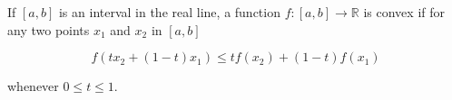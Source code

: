 If $[a, b]$ is an interval in the real line, a function $f: [a, b] \to \mathbb{R}$ is convex if for any two points $x_1$ and $x_2$ in $[a, b]$

$$f(tx_2 + (1-t)x_1) \leq tf(x_2) + (1-t)f(x_1)$$

whenever $0 \leq t \leq 1$.
